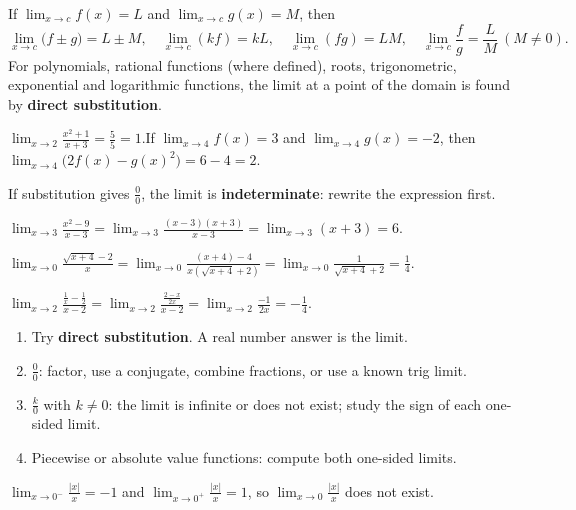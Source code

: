 \documentclass[11pt]{article}
\begin{document}
\begin{keyidea}
If $\displaystyle\lim_{x\to c}f(x)=L$ and $\displaystyle\lim_{x\to c}g(x)=M$, then
\[\lim_{x\to c}\big(f\pm g\big)=L\pm M,\quad \lim_{x\to c}(kf)=kL,\quad \lim_{x\to c}(fg)=LM,\quad \lim_{x\to c}\frac fg=\frac LM\ (M\neq0).\]
For polynomials, rational functions (where defined), roots, trigonometric, exponential and logarithmic functions, the limit at a point of the domain is found by \textbf{direct substitution}.
\end{keyidea}
\begin{example}
$\displaystyle\lim_{x\to2}\frac{x^2+1}{x+3}=\frac{5}{5}=1$.\qquad If $\displaystyle\lim_{x\to4}f(x)=3$ and $\displaystyle\lim_{x\to4}g(x)=-2$, then $\displaystyle\lim_{x\to4}\big(2f(x)-g(x)^2\big)=6-4=2$.
\end{example}

If substitution gives $\frac00$, the limit is \textbf{indeterminate}: rewrite the expression first.
\begin{example}[Factoring]
$\displaystyle\lim_{x\to3}\frac{x^2-9}{x-3}=\lim_{x\to3}\frac{(x-3)(x+3)}{x-3}=\lim_{x\to3}(x+3)=6.$
\end{example}
\begin{example}
$\displaystyle\lim_{x\to0}\frac{\sqrt{x+4}-2}{x}=\lim_{x\to0}\frac{(x+4)-4}{x\left(\sqrt{x+4}+2\right)}=\lim_{x\to0}\frac{1}{\sqrt{x+4}+2}=\frac14.$
\end{example}
\begin{example}
$\displaystyle\lim_{x\to2}\frac{\frac1x-\frac12}{x-2}=\lim_{x\to2}\frac{\frac{2-x}{2x}}{x-2}=\lim_{x\to2}\frac{-1}{2x}=-\frac14.$
\end{example}

\begin{keyidea}[Strategy]
\begin{enumerate}
\item Try \textbf{direct substitution}. A real number answer is the limit.
\item $\frac00$: factor, use a conjugate, combine fractions, or use a known trig limit.
\item $\frac{k}{0}$ with $k\neq0$: the limit is infinite or does not exist; study the sign of each one-sided limit.
\item Piecewise or absolute value functions: compute both one-sided limits.
\end{enumerate}
\end{keyidea}
\begin{example}
$\displaystyle\lim_{x\to0^-}\frac{|x|}{x}=-1$ and $\displaystyle\lim_{x\to0^+}\frac{|x|}{x}=1$, so $\displaystyle\lim_{x\to0}\frac{|x|}{x}$ does not exist.
\end{example}
\end{document}
